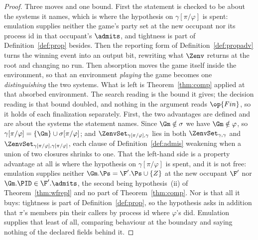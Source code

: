 \documentclass[10pt,oneside,openany]{book}
\theoremstyle{accentdef}
\theoremstyle{accentplain}
\begin{document}
\begin{proof}
Three moves and one bound. First the statement is checked to be about the systems it names, which
is where the hypothesis on $\gamma[\pi/\varphi]$ is spent: emulation supplies neither the game's
party set at the new occupant nor its process id in that occupant's $\admits$, and tightness is
part of Definition~\ref{def:prop} besides. Then the reporting form of Definition~\ref{def:propadv}
turns the winning event into an output bit, rewriting what $\Zenv$ returns at the root and changing
no run. Then absorption moves the game itself inside the environment, so that an environment
\emph{playing} the game becomes one \emph{distinguishing} the two systems. What is left is
Theorem~\ref{thm:comp} applied at that absorbed environment. The search reading is the bound it
gives; the decision reading is that bound doubled, and nothing in the argument reads $\op{Fin}$, so
it holds of each finalization separately.
First, the two advantages are defined and are about the systems the statement names. Since
$\Gm \notin \sigma$ we have $\Gm \notin \varphi$, so
$\gamma[\pi/\varphi] = \{\Gm\} \cup \sigma[\pi/\varphi]$; and
$\ZenvSet_{\gamma[\pi/\varphi],\gamma}$ lies in both $\ZenvSet_{\gamma,\gamma}$ and
$\ZenvSet_{\gamma[\pi/\varphi],\gamma[\pi/\varphi]}$, each clause of Definition~\ref{def:admis}
weakening when a union of two closures shrinks to one. That the left-hand side is a property advantage
at all is where the hypothesis on $\gamma[\pi/\varphi]$ is spent, and it is not free: emulation supplies
neither $\Gm.\Ps = \F'.\Ps \cup \{Z\}$ at the new occupant $\F'$ nor $\Gm.\PID \in \F'.\admits$, the
second being hypothesis~(ii) of Theorem~\ref{thm:wfrepl} and no part of Theorem~\ref{thm:comp}. Nor is
that all it buys: tightness is part of Definition~\ref{def:prop}, so the hypothesis asks in addition
that $\pi$'s members pin their callers by process id where $\varphi$'s did. Emulation supplies that
least of all, comparing behaviour at the boundary and saying nothing of the declared fields behind it.


\end{proof}
\end{document}
